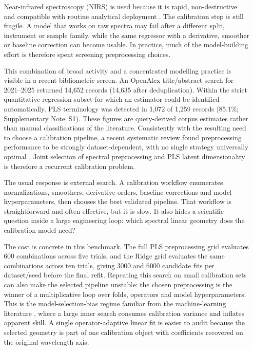 \documentclass[11pt,a4paper]{article}
\begin{document}
Near-infrared spectroscopy (NIRS) is used because it is rapid,
non-destructive and compatible with routine analytical deployment
\citep{burns2007handbook,pasquini2018near}.  The calibration step is still
fragile.  A model that works on raw spectra may fail after a different split,
instrument or sample family, while the same regressor with a derivative,
smoother or baseline correction can become usable.  In practice, much of the
model-building effort is therefore spent screening preprocessing choices.

This combination of broad activity and a concentrated modelling practice is
visible in a recent bibliometric screen.  An OpenAlex title/abstract search
for 2021--2025 returned 14,652 records (14,635 after deduplication).  Within
the strict quantitative-regression subset for which an estimator could be
identified automatically, PLS terminology was detected in 1,072 of 1,259
records (85.1\%; Supplementary Note~S1).  These
figures are query-derived corpus estimates rather than manual classifications
of the literature.  Consistently with the resulting need to choose a
calibration pipeline, a recent systematic review found preprocessing
performance to be strongly dataset-dependent, with no single strategy
universally optimal \citep{wahab2026optimizing}.  Joint selection of spectral
preprocessing and PLS latent dimensionality is therefore a recurrent
calibration problem.

The usual response is external search.  A calibration workflow enumerates
normalizations, smoothers, derivative orders, baseline corrections and model
hyperparameters, then chooses the best validated pipeline.  That workflow is
straightforward and often effective, but it is slow.  It also hides a
scientific question inside a large engineering loop: which spectral linear
geometry does the calibration model need?

The cost is concrete in this benchmark.  The full PLS preprocessing grid
evaluates 600 combinations across five trials, and the Ridge grid evaluates
the same combinations across ten trials, giving 3000 and 6000 candidate fits
per dataset/seed before the final refit.  Repeating this search on small
calibration sets can also make the selected pipeline unstable: the chosen
preprocessing is the winner of a multiplicative loop over folds, operators and
model hyperparameters.  This is the model-selection-bias regime familiar from
the machine-learning literature
\citep{varma2006bias,cawley2010overfitting,bergstra2012random}, where a large
inner search consumes calibration variance and inflates apparent skill.  A
single operator-adaptive linear fit is easier to audit because the selected
geometry is part of one calibration object with coefficients recovered on the
original wavelength axis.
\end{document}
